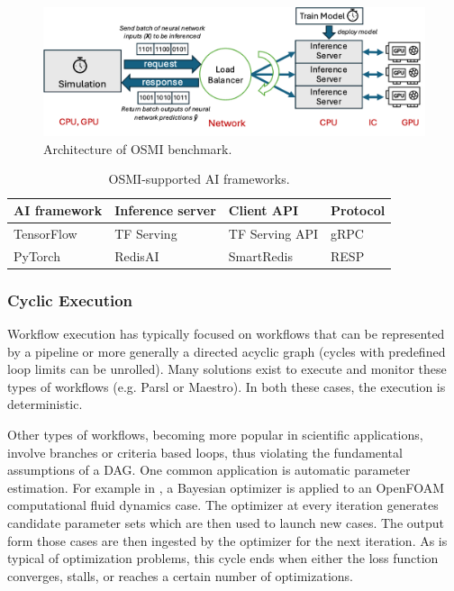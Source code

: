 \documentclass[utf8]{FrontiersinVancouver} %
\begin{document}
\begin{figure}[t]
    \centering
    \includegraphics[width=\linewidth]{images/osmi_arch.png}
    \caption{Architecture of OSMI benchmark.}
    \label{fig:osmi}
\end{figure}

\begin{table}[t]
\centering
\renewcommand{\arraystretch}{1.5}
\begin{tabular}{llll}
\hline
\textbf{AI framework} & \textbf{Inference server} & \textbf{Client API} & \textbf{Protocol} \\ \hline
TensorFlow & TF Serving  & TF Serving API  & gRPC  \\
PyTorch    & RedisAI     & SmartRedis      & RESP  \\ \hline
\end{tabular}
\caption{OSMI-supported AI frameworks.}
\label{tab:osmi}
\end{table}

\subsubsection{Cyclic Execution }

Workflow execution has typically focused on workflows that can be represented by
a pipeline or more generally a directed acyclic graph (cycles with predefined
loop limits can be unrolled). Many solutions exist to execute and monitor these
types of workflows (e.g. Parsl or Maestro). In both these cases, the execution
is deterministic.

Other types of workflows, becoming more popular in scientific applications,
involve branches or criteria based loops, thus violating the fundamental
assumptions of a DAG. One common application is automatic parameter estimation.
For example in \citep{Maric2024OpenFOAM}, a Bayesian optimizer is applied to
an OpenFOAM computational fluid dynamics case. The optimizer at every iteration
generates candidate parameter sets which are then used to launch new cases. The
output form those cases are then ingested by the optimizer for the next
iteration. As is typical of optimization problems, this cycle ends when either
the loss function converges, stalls, or reaches a certain number of
optimizations.
\end{document}
